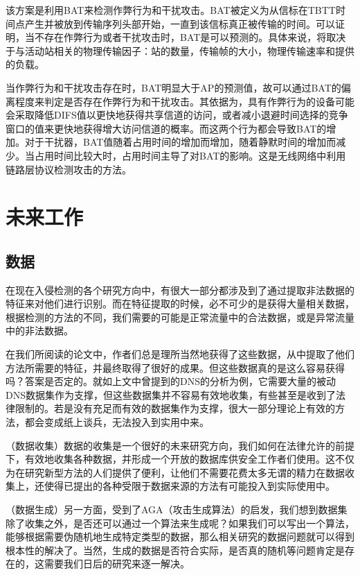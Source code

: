 \documentclass[12pt]{article} %
\begin{document}
该方案是利用BAT来检测作弊行为和干扰攻击。BAT被定义为从信标在TBTT时间点产生并被放到传输序列头部开始，一直到该信标真正被传输的时间。可以证明，当不存在作弊行为或者干扰攻击时，BAT是可以预测的。具体来说，将取决于与活动站相关的物理传输因子：站的数量，传输帧的大小，物理传输速率和提供的负载。

当作弊行为和干扰攻击存在时，BAT明显大于AP的预测值，故可以通过BAT的偏离程度来判定是否存在作弊行为和干扰攻击。其依据为，具有作弊行为的设备可能会采取降低DIFS值以更快地获得共享信道的访问，或者减小退避时间选择的竞争窗口的值来更快地获得增大访问信道的概率。而这两个行为都会导致BAT的增加。对于干扰器，BAT值随着占用时间的增加而增加，随着静默时间的增加而减少。当占用时间比较大时，占用时间主导了对BAT的影响。这是无线网络中利用链路层协议检测攻击的方法。

\section{未来工作}
\label{future}

\subsection{数据}
\label{data}

在现在入侵检测的各个研究方向中，有很大一部分都涉及到了通过提取非法数据的特征来对他们进行识别。而在特征提取的时候，必不可少的是获得大量相关数据，根据检测的方法的不同，我们需要的可能是正常流量中的合法数据，或是异常流量中的非法数据。

在我们所阅读的论文中，作者们总是理所当然地获得了这些数据，从中提取了他们方法所需要的特征，并最终取得了很好的成果。但这些数据真的是这么容易获得吗？答案是否定的。就如上文中曾提到的DNS的分析为例，它需要大量的被动DNS数据集作为支撑，但这些数据集并不容易有效地收集，有些甚至是收到了法律限制的。若是没有充足而有效的数据集作为支撑，很大一部分理论上有效的方法，都会变成纸上谈兵，无法投入到实用中来。

（数据收集）数据的收集是一个很好的未来研究方向，我们如何在法律允许的前提下，有效地收集各种数据，并形成一个开放的数据库供安全工作者们使用。这不仅为在研究新型方法的人们提供了便利，让他们不需要花费太多无谓的精力在数据收集上，还使得已提出的各种受限于数据来源的方法有可能投入到实际使用中。

（数据生成）另一方面，受到了AGA（攻击生成算法）的启发，我们想到数据集除了收集之外，是否还可以通过一个算法来生成呢？如果我们可以写出一个算法，能够根据需要伪随机地生成特定类型的数据，那么相关研究的数据问题就可以得到根本性的解决了。当然，生成的数据是否符合实际，是否真的随机等问题肯定是存在的，这需要我们日后的研究来逐一解决。
\end{document}
